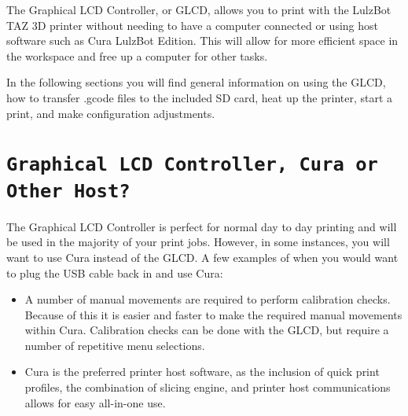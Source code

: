 %
%
%
%
%



The Graphical LCD Controller, or GLCD, allows you to print with the LulzBot TAZ 3D printer without needing to have a computer connected or using host software such as Cura LulzBot Edition. This will allow for more efficient space in the workspace and free up a computer for other tasks.

In the following sections you will find general information on using the GLCD, how to transfer .gcode files to the included SD card, heat up the printer, start a print, and make configuration adjustments.

\section{\texttt{Graphical LCD Controller, Cura or Other Host?}}
\label{sec:Graphic LCD, Cura or Other Host?}
The Graphical LCD Controller is perfect for normal day to day printing and will be used in the majority of your print jobs. However, in some instances, you will want to use Cura instead of the GLCD. A few examples of when you would want to plug the USB cable back in and use Cura:
\begin{itemize}
	\item A number of manual movements are required to perform calibration checks. Because of this it is easier and faster to make the required manual movements within Cura. Calibration checks can be done with the GLCD, but require a number of repetitive menu selections. 
	\item Cura is the preferred printer host software, as the inclusion of quick print profiles, the combination of slicing engine, and printer host communications allows for easy all-in-one use.
\end{itemize}

